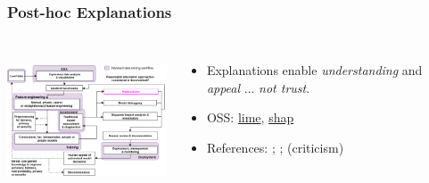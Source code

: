 \documentclass[11pt,
               aspectratio=169,
               hyperref={colorlinks}
               ]{beamer}
\begin{document}
			\begin{frame}
		
				\frametitle{Post-hoc Explanations}		
			
				\begin{columns}
	
					\centering
					\includegraphics[height=120pt]{img/exp.png}
				
					\vspace{-5pt}
					
					\small{
					\begin{itemize}
						\item Explanations enable \textit{understanding} and \textit{appeal} ... \textit{not trust}.
						\item OSS: \href{https://github.com/marcotcr/lime}{lime}, \href{https://github.com/slundberg/shap}{shap} 
						\item References: ; ;  (criticism)
					\end{itemize}}
				
				\end{columns}
		
			\end{frame}
\end{document}
